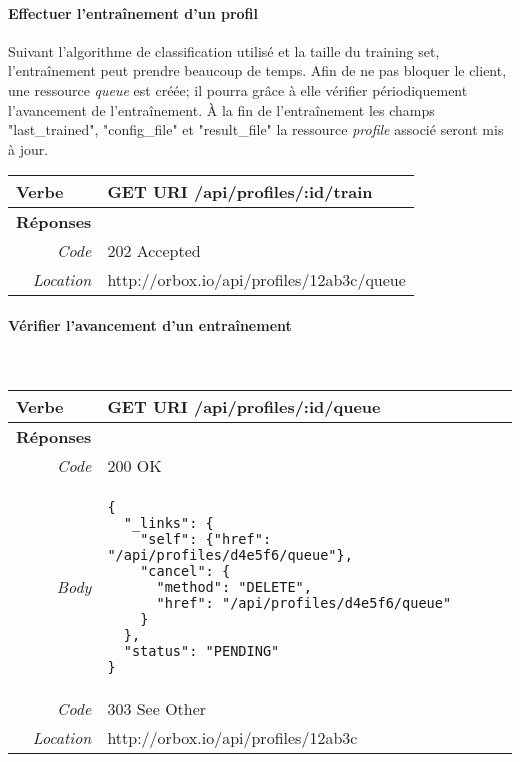 \begin{appendices}
\begin{absolutelynopagebreak}
\paragraph{Effectuer l'entraînement d'un profil}
\label{ApiProfilesTrain}
Suivant l'algorithme de classification utilisé et la taille du training set, l'entraînement peut prendre beaucoup de temps.
Afin de ne pas bloquer le client, une ressource \emph{queue} est créée; il pourra grâce à elle vérifier périodiquement l'avancement de l'entraînement.
À la fin de l'entraînement les champs "last\_trained", "config\_file" et "result\_file" la ressource \emph{profile} associé seront mis à jour.

\begin{tabular}{@{}p{2cm}p{11.5cm}@{}}
    \toprule
    \textbf{Verbe}                        & GET \hspace{2.5cm} \textbf{URI} \hspace{0.25cm} /api/profiles/:id/train   \\ \midrule
    \textbf{Réponses}                     &        \\
    \multicolumn{1}{r}{\textit{Code}}   & 202 Accepted \\
    \multicolumn{1}{r}{\textit{Location}}   &  http://orbox.io/api/profiles/12ab3c/queue \\
    \bottomrule
\end{tabular}
\end{absolutelynopagebreak}

\begin{absolutelynopagebreak}
\paragraph{Vérifier l'avancement d'un entraînement}
~

\begin{tabular}{@{}p{2cm}p{11.5cm}@{}}
    \toprule
    \textbf{Verbe}                        & GET \hspace{2.5cm} \textbf{URI} \hspace{0.25cm} /api/profiles/:id/queue   \\ \midrule
    \textbf{Réponses}                     &        \\
    \multicolumn{1}{r}{\textit{Code}}   & 200 OK \\
    \multicolumn{1}{r}{\textit{Body}}   & \begin{verbatim}
{
  "_links": {
    "self": {"href": "/api/profiles/d4e5f6/queue"},
    "cancel": {
      "method": "DELETE",
      "href": "/api/profiles/d4e5f6/queue"
    }
  },
  "status": "PENDING"
}
    \end{verbatim}
    \\ \midrule
    \multicolumn{1}{r}{\textit{Code}}   & 303 See Other \\
    \multicolumn{1}{r}{\textit{Location}}   &  http://orbox.io/api/profiles/12ab3c \\
    \bottomrule
\end{tabular}
\end{absolutelynopagebreak}


\end{appendices}
